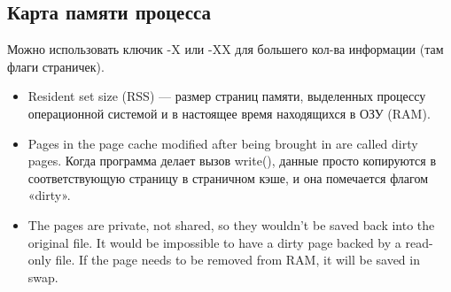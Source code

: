 \documentclass[11pt, a4paper]{article}
\begin{document}
\subsection{Карта памяти процесса}
Можно использовать ключик -X или -XX для большего кол-ва информации (там флаги страничек).

\begin{itemize}
  \item Resident set size (RSS) — размер страниц памяти, выделенных процессу операционной системой и в настоящее время находящихся в ОЗУ (RAM).
  \item Pages in the page cache modified after being brought in are called dirty pages. Когда программа делает вызов write(), данные просто копируются в соответствующую страницу в страничном кэше, и она помечается флагом «dirty».
  \item The pages are private, not shared, so they wouldn't be saved back into the original file. It would be impossible to have a dirty page backed by a read-only file. If the page needs to be removed from RAM, it will be saved in swap.
\end{itemize}
\end{document}
